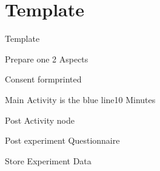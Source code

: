 

\section{Template} \label{sec:template}
\begin{checklist}{Template}
  \item{Prepare one }{2 Aspects} 
  \item{Consent form}{printed}
  \item{Main Activity is the blue line}{10 Minutes}
  \item{Post Activity node}{}
  \item{Post experiment Questionnaire}{}
  \item{Store Experiment Data}{}
\end{checklist}